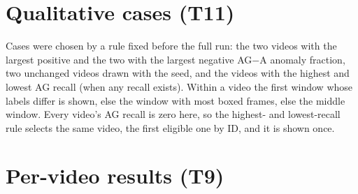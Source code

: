 \documentclass[11pt]{article}
\begin{document}
\section{Qualitative cases (T11)}\label{app:cases}
Cases were chosen by a rule fixed before the full run: the two videos with the largest positive and the two with the largest negative AG$-$A anomaly fraction, two unchanged videos drawn with the seed, and the videos with the highest and lowest AG recall (when any recall exists). Within a video the first window whose labels differ is shown, else the window with most boxed frames, else the middle window. Every video's AG recall is zero here, so the highest- and lowest-recall rule selects the same video, the first eligible one by ID, and it is shown once.


\section{Per-video results (T9)}

\end{document}
